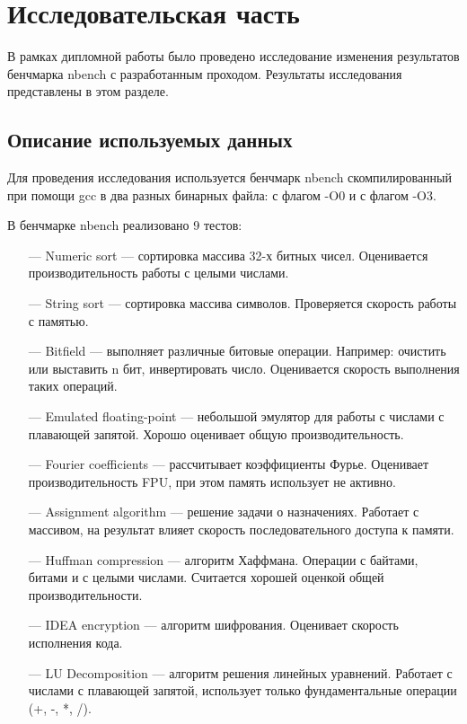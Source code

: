 \section{Исследовательская часть}

В рамках дипломной работы было проведено исследование изменения результатов бенчмарка nbench с разработанным проходом. Результаты исследования представлены в этом разделе.

\subsection{Описание используемых данных}

Для проведения исследования используется бенчмарк nbench скомпилированный при помощи gcc в два разных бинарных файла: с флагом -O0 и с флагом -O3.

В бенчмарке nbench реализовано 9 тестов:

\begin{itemize}[leftmargin=1.6\parindent]
	\item[---] Numeric sort --- сортировка массива 32-х битных чисел. Оценивается производительность работы с целыми числами.
	\item[---] String sort --- сортировка массива символов. Проверяется скорость работы с памятью.
	\item[---] Bitfield --- выполняет различные битовые операции. Например: очистить или выставить n бит, инвертировать число. Оценивается скорость выполнения таких операций.
	\item[---] Emulated floating-point --- небольшой эмулятор для работы с числами с плавающей запятой. Хорошо оценивает общую производительность.
	\item[---] Fourier coefficients --- рассчитывает коэффициенты Фурье. Оценивает производительность FPU, при этом память использует не активно.
	\item[---] Assignment algorithm --- решение задачи о назначениях. Работает с массивом, на результат влияет скорость последовательного доступа к памяти.
	\item[---] Huffman compression --- алгоритм Хаффмана. Операции с байтами, битами и с целыми числами. Считается хорошей оценкой общей производительности.
	\item[---] IDEA encryption --- алгоритм шифрования. Оценивает скорость исполнения кода.
	\item[---] LU Decomposition ---  алгоритм решения линейных уравнений. Работает с числами с плавающей запятой, использует только фундаментальные операции (+, -, *, /).
\end{itemize}

